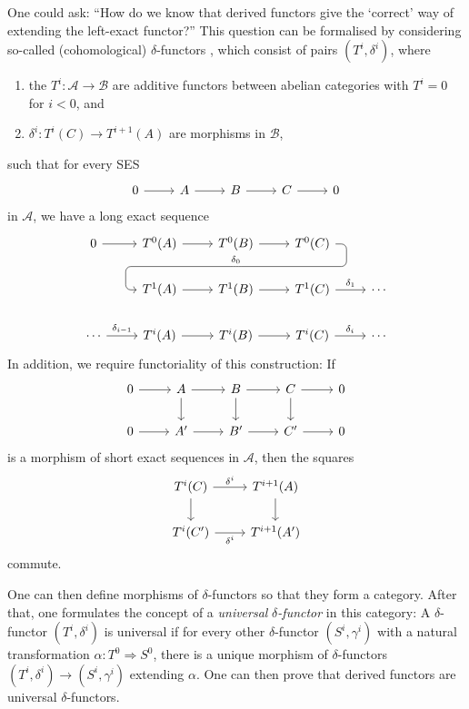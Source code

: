 \begin{bcat}
  One could ask: ``How do we know that derived functors give the `correct'
  way of extending the left-exact functor?'' This question can be
  formalised by considering so-called (cohomological) $\delta$-functors
  \cite{vakil}, which consist of pairs $(T^{i},\delta^{i})$, where
  \begin{enumerate}
    \item the $T^{i}:\mathcal{A}\to\mathcal{B}$ are additive functors between
          abelian categories with $T^{i}=0$ for $i<0$, and
    \item $\delta^{i}:T^{i}(C)\to T^{i+1}(A)$ are morphisms in $\mathcal{B}$,
  \end{enumerate}
  such that for every SES
  \[\begin{tikzcd}
      0\rar & A\rar & B\rar & C\rar & 0
    \end{tikzcd}\]
  in $\mathcal{A}$, we have a long exact sequence
  \[\begin{tikzcd}
      0\rar & T^{0}(A)\rar & T^{0}(B)\rar\dar[phantom, ""{coordinate, name=Z}]
      & T^{0}(C)\arrow[rounded corners, to path={[pos=0] --
      ([xshift=2ex]\tikztostart.east) |- (Z) -|
      ([xshift=-2ex]\tikztotarget.west)\tikztonodes -- (\tikztotarget)},
    "\delta_{0}"']{dll} & \\
    & T^{1}(A)\rar & T^{1}(B)\rar & T^{1}(C)\rar{\delta_{1}} & \cdots \\
    \cdots \rar{\delta_{i-1}}& T^{i}(A)\rar & T^{i}(B)\rar
    & T^{i}(C)\rar{\delta_{i}} & \cdots
    \end{tikzcd}\]
  In addition, we require functoriality of this construction: If
  \[\begin{tikzcd}
      0\rar & A\rar\dar & B\rar\dar & C\rar\dar & 0 \\
      0\rar & A^{\prime}\rar & B^{\prime}\rar & C^{\prime}\rar & 0
    \end{tikzcd}\]
  is a morphism of short exact sequences in $\mathcal{A}$, then the
  squares
  \[\begin{tikzcd}
      T^{i}(C)\rar{\delta^{i}}\dar & T^{i+1}(A)\dar \\
      T^{i}(C^{\prime})\arrow["\delta^{i}"']{r} & T^{i+1}(A^{\prime})
    \end{tikzcd}\]
  commute.

  One can then define morphisms of $\delta$-functors so that they form
  a category. After that, one formulates the concept of a \emph{universal}
  $\delta$\emph{-functor} in this category: A $\delta$-functor
  $(T^{i},\delta^{i})$ is universal if for every other $\delta$-functor
  $(S^{i},\gamma^{i})$ with a natural transformation
  $\alpha: T^{0}\Rightarrow S^{0}$, there is a unique morphism of
  $\delta$-functors $(T^{i},\delta^{i})\to (S^{i},\gamma^{i})$ extending
  $\alpha$. One can then prove that derived functors are universal
  $\delta$-functors.
\end{bcat}
